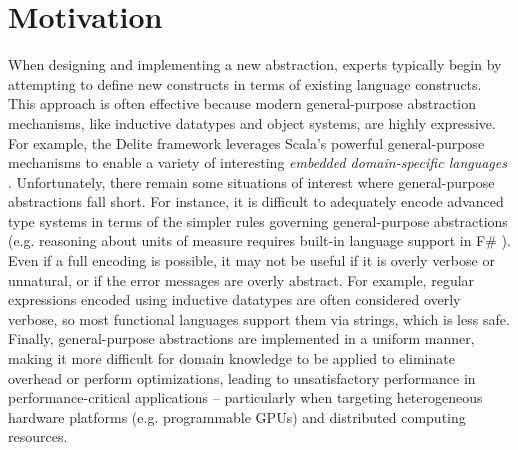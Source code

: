 \documentclass{llncs}
\begin{document}
\section{Motivation}
When designing and implementing a new abstraction, experts typically begin by attempting to define new constructs in terms of existing language constructs.
This approach is often effective because modern {general-purpose} abstraction mechanisms, like inductive datatypes and object systems, are highly expressive.  
For example, the Delite framework leverages Scala's powerful general-purpose mechanisms to enable a variety of interesting \emph{embedded domain-specific languages} \cite{delite}. 
Unfortunately, there remain some situations of interest where general-purpose abstractions fall short. 
For instance, it is difficult to adequately encode advanced type systems in terms of the simpler rules governing general-purpose abstractions (e.g. reasoning about units of measure requires built-in language support in F\# \cite{units-of-measure}). 
Even if a full encoding is possible, it may not be useful if it is overly verbose or unnatural, or if the error messages are overly abstract. For example, regular expressions encoded using inductive datatypes are often considered overly verbose, so most functional languages support them via strings, which is less safe. 
Finally, general-purpose abstractions are implemented in a uniform manner, making it more difficult for domain knowledge to be applied to eliminate overhead or perform optimizations, leading to unsatisfactory performance in performance-critical applications -- particularly when targeting heterogeneous hardware platforms (e.g. programmable GPUs) and distributed computing resources.


\end{document}
